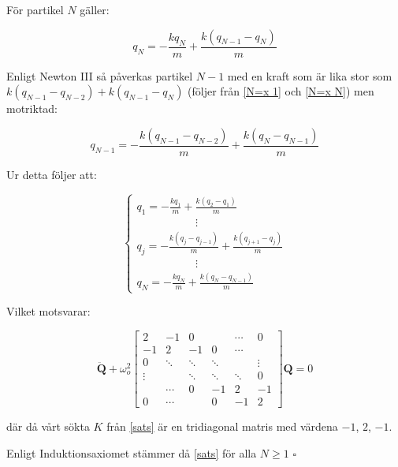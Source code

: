 \documentclass[12pt,a4paper]{article}
\begin{document}
\begin{appendix}
		För partikel $N$ gäller:
		
		\begin{equation}
			q_N = -\frac{k q_N}{m} + \frac{k (q_{N-1} - q_N)}{m}
			\label{N=x N}
		\end{equation}
		
		Enligt Newton III så påverkas partikel $N - 1$ med en kraft som är lika stor
		som $k(q_{N-1} - q_{N-2}) + k (q_{N-1} - q_N)$ (följer från \ref{N=x 1} och \ref{N=x N})
		men motriktad:
		
		\begin{equation}
			q_{N-1} = -\frac{k(q_{N-1}-q_{N-2})}{m} + \frac{k (q_N - q_{N-1})}{m}
		\end{equation}
		
		Ur detta följer att:
		
		\begin{equation*}
			\begin{cases}
				q_1 = -\frac{k q_1}{m} + \frac{k(q_2 - q_1)}{m} \\
				\hspace{64pt} \vdots \\
				q_j = -\frac{k (q_j - q_{j-1})}{m} + \frac{k(q_{j+1}-q_j)}{m} \\
				\hspace{64pt} \vdots \\
				q_N = -\frac{k q_N}{m} + \frac{k (q_N - q_{N-1})}{m}
			\end{cases}
		\end{equation*}
		
		Vilket motsvarar:
		
		\begin{equation*}
			\mathbf{\ddot{Q}} + \omega_o^2 \begin{bmatrix}
				2 & -1 & 0 & & \cdots & 0 \\
				-1 & 2 & -1 & 0 & \cdots & \\
				0 & \ddots & \ddots & \ddots & & \vdots \\
				\vdots &  & \ddots & \ddots & \ddots & 0 \\
				& \cdots & 0 & -1 & 2  & -1 \\
				0 & \cdots & & 0 & -1 & 2
			\end{bmatrix} \mathbf{Q} = 0
		\end{equation*}
		
		där då vårt sökta $K$ från \ref{sats} är en tridiagonal matris med värdena $-1$, $2$, $-1$.
		
		Enligt Induktionsaxiomet stämmer då \ref{sats} för alla $N \geq 1$ \hfill $\square$
		
	\end{appendix}
\end{document}
